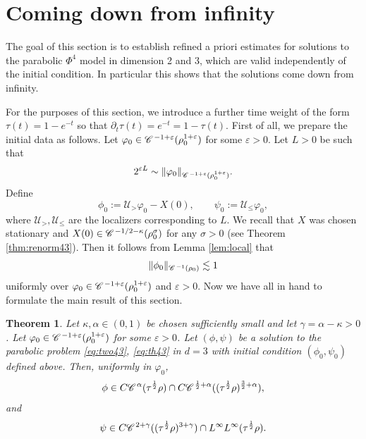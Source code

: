 \documentclass[a4paper,11pt]{article}
\renewcommand{\leq}{\leqslant}
\newtheorem{theorem}{Theorem}[section]
\numberwithin{equation}{section}
\newcommand{\CC}{\mathscr{C} \hspace{.1em}}
\newcommand{\UU}{\mathscr{U}}
\newcommand{\8}{\infty}
\begin{document}
\section{Coming down from infinity}
\label{s:d}

The goal of this section is to establish refined a priori estimates for solutions to the parabolic $\Phi^{4}$ model in dimension 2 and 3, which are valid independently of the initial condition. In particular this shows  that the solutions come down from infinity.

For the purposes of this section, we introduce a further time weight of the form $\tau (t) = 1 - e^{- t}$ so
that $\partial_t \tau (t) =  e^{- t} = 1 - \tau (t)$.
First of all, we prepare the initial data as follows. Let $\varphi_{0}\in \CC^{ - 1 + \varepsilon}
     (\rho^{1+\varepsilon}_0)$ for some $\varepsilon>0$.  Let $L>0$ be such that 
  \[ 2^{\varepsilon L} \sim \| \varphi_0 \|_{\CC^{ - 1 + \varepsilon}
     (\rho^{1+\varepsilon}_0)} . \]
Define 
$$\phi_{0}:=\UU_{>}
 \varphi_{0}-X(0),\qquad \psi_{0}:=\UU_{\leq}\varphi_{0},$$
 where $\UU_{>},\UU_{\leq}$ are the localizers corresponding to $L$. We recall that $X$ was chosen stationary and $X(0)\in \CC^{-1/2-\kappa}(\rho^{\sigma}_{0})$ for any $\sigma>0$  (see Theorem \ref{thm:renorm43}). Then it follows from Lemma \ref{lem:local} that
  \begin{equation}\label{eq:phi0}
  \|  \phi_0 \|_{\CC^{ - 1} (\rho_0)} \lesssim 1 
  \end{equation}
  uniformly over $\varphi_0 \in \CC^{ - 1 + \varepsilon} (\rho^{1+\varepsilon}_0)$ and $\varepsilon>0$.
Now we have all in hand to formulate the main result of this section.








\begin{theorem}
  \label{th:come-down-3}
  Let $\kappa, \alpha\in (0,1)$ be chosen sufficiently small and let $\gamma=\alpha-\kappa>0$. Let $\varphi_{0}\in \CC^{ - 1 + \varepsilon}
     (\rho^{1+\varepsilon}_0)$ for some $\varepsilon>0$. Let $(\phi, \psi)$ be a solution to the parabolic problem \eqref{eq:two43}, \eqref{eq:th43}
  in $d = 3$ with initial condition $(\phi_{0},\psi_{0})$ defined above.  
  Then, uniformly in $\varphi_{0}$,
  \[ \phi \in C \CC^{\alpha} (\tau^{\frac{1}{2}} \rho) \cap C \CC^{\frac{1}{2}
     + \alpha} ((\tau^{\frac{1}{2}} \rho)^{\frac{3}{2} + \alpha}), \]
  and
  \[ \psi \in C \CC^{2 + \gamma} ((\tau^{\frac{1}{2}} \rho)^{3 + \gamma}) \cap
     L^{\infty} L^{\infty} (\tau^{\frac{1}{2}} \rho) . \]
\end{theorem}
\end{document}
